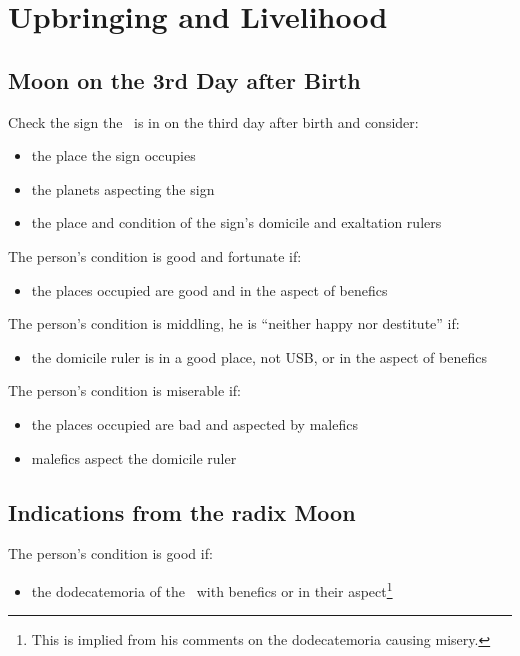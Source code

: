 \section{Upbringing and Livelihood}
\label{sec:upbringing4}
\subsection{Moon on the 3rd Day after Birth}
Check the sign the \Moon\, is in on the third day after birth and consider:
\begin{itemize}[topsep=0em,itemsep=0em]
\item the place the sign occupies
\item the planets aspecting the sign
\item the place and condition of the sign's domicile  and exaltation rulers
\end{itemize}

\noindent The person's condition is good and fortunate if:
\begin{itemize}[topsep=0em,itemsep=0em]
\item the places occupied are good and in the aspect of benefics
\end{itemize}

\noindent The person's condition is middling, he is ``neither happy nor destitute'' if:
\begin{itemize}[topsep=0em,itemsep=0em]
\item the domicile ruler is in a good place, not USB, or in the aspect of benefics
\end{itemize}

\noindent The person's condition is miserable if:
\begin{itemize}[topsep=0em,itemsep=0em]
\item the places occupied are bad and aspected by malefics
\item malefics aspect the domicile ruler
\end{itemize}

\subsection{Indications from the radix Moon}
The person's condition is good if:
\begin{itemize}[topsep=0em,itemsep=0em]
\item the dodecatemoria of the \Moon\, with benefics or in their aspect\footnote{This is implied from his comments on the dodecatemoria causing misery.}
\end{itemize}

